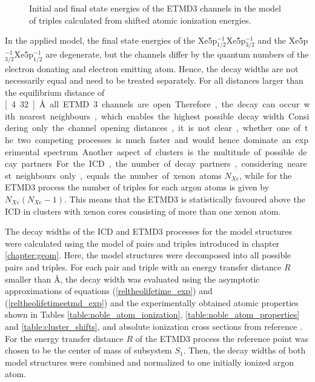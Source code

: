\begin{figure}[htb]
 \centering
 
 \caption{Initial and final state energies of the \ac{ETMD}3 channels
          in the model of triples calculated from shifted atomic ionization
          energies.}
 \label{figure:ArXe_energy_etmd_curves}
\end{figure}

In the applied model, the final state energies of the
Xe5p$_{1/2}^{-1}$Xe5p$_{3/2}^{-1}$ and
the Xe5p$_{3/2}^{-1}$Xe5p$_{1/2}^{-1}$ are degenerate, but the channels
differ by the quantum
numbers of the electron donating and electron emitting atom. Hence, the decay
widths are not necessarily equal and need to be treated separately.
For all distances larger than the equilibrium distance of \unit[4.32]{\AA}
all \ac{ETMD}3 channels are open. Therefore, the decay can occur with
nearest neighbours, which enables the highest possible decay width.

Considering only the channel opening distances, it is not clear, whether
one of the two competing processes is much faster and would hence dominate
an experimental spectrum. Another aspect of clusters is the multitude of
possible decay partners. For the \ac{ICD}, the number of decay partners,
considering nearest neighbours only, equals
the number of xenon atoms $N_{Xe}$, while for the \ac{ETMD}3 process the number
of triples for each argon atoms is given by $N_{Xe}(N_{Xe}-1)$. This means that
the \ac{ETMD}3 is statistically favoured above the \ac{ICD} in clusters with
xenon cores consisting of more than one xenon atom.

The decay widths of the \ac{ICD} and \ac{ETMD}3 processes for the model
structures were calculated using the model of pairs and triples introduced in
chapter \ref{chapter:geom}. Here, the model structures were decomposed
into all possible pairs and triples. For each pair and triple with an energy
transfer distance $R$ smaller than \unit[11]{\AA}, the decay width was evaluated
using
the asymptotic approximations of equations
(\ref{reltheolifetime_exp}) and (\ref{reltheolifetimeetmd_exp}) and the
experimentally obtained atomic properties shown in Tables
\ref{table:noble_atom_ionization}, \ref{table:noble_atom_properties} and
\ref{table:cluster_shifts}, and absolute ionization cross sections from reference
\cite{West78}. For the energy transfer distance $R$ of the \ac{ETMD}3 process
the reference point was chosen to be the center of mass of
subsystem $S_1$. 
Then, the decay widths of both model structures were combined and normalized
to one initially ionized argon atom.

